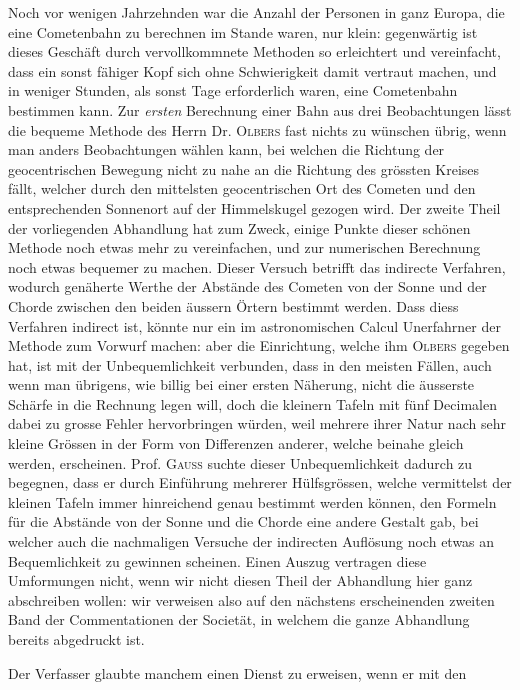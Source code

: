 %
Noch vor wenigen Jahrzehnden war die Anzahl der Personen in ganz Europa,
die eine Cometenbahn zu berechnen im Stande waren, nur klein: gegenwärtig
ist dieses Geschäft durch vervollkommnete Methoden so erleichtert und
vereinfacht, dass ein sonst fähiger Kopf sich ohne Schwierigkeit damit vertraut
machen, und in weniger Stunden, als sonst Tage erforderlich waren, eine Cometenbahn
bestimmen kann. Zur \textit{ersten} Berechnung einer Bahn aus drei Beobachtungen
lässt die bequeme Methode des Herrn Dr. \textsc{Olbers} fast nichts zu wünschen
übrig, wenn man anders Beobachtungen wählen kann, bei welchen die
Richtung der geocentrischen Bewegung nicht zu nahe an die Richtung des grössten
Kreises fällt, welcher durch den mittelsten geocentrischen Ort des Cometen
und den entsprechenden Sonnenort auf der Himmelskugel gezogen wird. Der
zweite Theil der vorliegenden Abhandlung hat zum Zweck, einige Punkte dieser
schönen Methode noch etwas mehr zu vereinfachen, und zur numerischen
Berechnung noch etwas bequemer zu machen. Dieser Versuch betrifft das indirecte
Verfahren, wodurch genäherte Werthe der Abstände des Cometen von der
Sonne und der Chorde zwischen den beiden äussern Örtern bestimmt werden.
Dass diess Verfahren indirect ist, könnte nur ein im astronomischen Calcul Unerfahrner
der Methode zum Vorwurf machen: aber die Einrichtung, welche ihm
\textsc{Olbers} gegeben hat, ist mit der Unbequemlichkeit verbunden, dass in den meisten
Fällen, auch wenn man übrigens, wie billig bei einer ersten Näherung, nicht
die äusserste Schärfe in die Rechnung legen will, doch die kleinern Tafeln mit
fünf Decimalen dabei zu grosse Fehler hervorbringen würden, weil mehrere ihrer
Natur nach sehr kleine Grössen in der Form von Differenzen anderer, welche
beinahe gleich werden, erscheinen. Prof. \textsc{Gauss} suchte dieser Unbequemlichkeit
dadurch zu begegnen, dass er durch Einführung mehrerer Hülfsgrössen,
welche vermittelst der kleinen Tafeln immer hinreichend genau bestimmt werden
können, den Formeln für die Abstände von der Sonne und die Chorde eine andere
Gestalt gab, bei welcher auch die nachmaligen Versuche der indirecten Auflösung
noch etwas an Bequemlichkeit zu gewinnen scheinen. Einen Auszug vertragen
diese Umformungen nicht, wenn wir nicht diesen Theil der Abhandlung
hier ganz abschreiben wollen: wir verweisen also auf den nächstens erscheinenden
zweiten Band der Commentationen der Societät, in welchem die ganze Abhandlung
bereits abgedruckt ist.

Der Verfasser glaubte manchem einen Dienst zu erweisen, wenn er mit den
